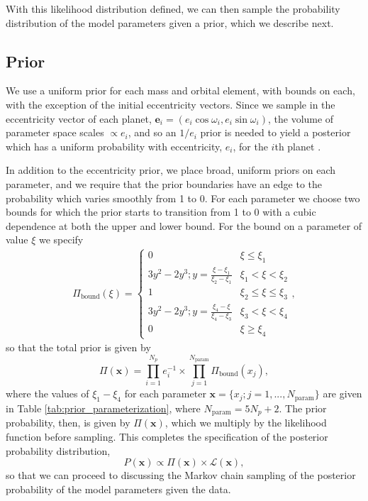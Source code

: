 \documentclass[twocolumn]{aastex63}
\begin{document}
With this likelihood distribution
defined, we can then sample the probability distribution of
the model parameters given a prior, which we describe next.

\subsection{Prior}

We use a uniform prior for each mass and orbital element,
with bounds on each, with the exception of the initial eccentricity vectors.
Since we sample in the eccentricity vector of each planet, $\mathbf{e}_i = (e_i\cos{\omega_i},e_i\sin{\omega_i})$, the volume
of parameter space scales $\propto e_i$, and so an $1/e_i$ prior is needed to
yield a posterior which has a uniform probability with eccentricity, $e_i$,
for the $i$th planet
\citep{Eastman2013}.

In addition to the eccentricity prior, we place broad, uniform priors on each parameter, and we require that
the prior boundaries have an edge to the probability which varies smoothly from 1 to 0.  For each parameter
we choose two bounds for which the prior starts to transition from 1 to 0 with a cubic dependence at both
the upper and lower bound.  For the  bound on a parameter of value $\xi$ we specify
\begin{eqnarray}
    \Pi_\mathrm{bound}(\xi) =
    \begin{cases}
        0                                            & \xi {\le} \xi_1             \\
        3y^2-2y^3; y = \frac{\xi-\xi_1}{\xi_2-\xi_1} & \xi_1 {<} \xi {<} \xi_2     \\
        1                                            & \xi_2 {\le} \xi {\le} \xi_3 \\
        3y^2-2y^3; y = \frac{\xi_4-\xi}{\xi_4-\xi_3} & \xi_3{<} \xi {<} \xi_4      \\
        0                                            & \xi {\ge} \xi_4
    \end{cases},
\end{eqnarray}
so that the total prior is given by
\begin{equation}
    \Pi(\mathbf{x}) = \prod_{i=1}^{N_p} e_i^{-1} {\times} \prod_{j=1}^{N_\mathrm{param}} \Pi_\mathrm{bound}(x_j),
\end{equation}
where the values of $\xi_1{-}\xi_4$ for each parameter
$\mathbf{x} {=} \{x_j; j{=} 1,...,N_\mathrm{param}\}$ are given in Table
\ref{tab:prior_parameterization}, where $N_\mathrm{param} = 5 N_p + 2$.
The prior probability, then, is given by $\Pi(\mathbf{x})$, which we
multiply by the likelihood function before sampling.
This completes the specification of the posterior probability distribution,
\begin{equation}
    P(\mathbf{x}) \propto \Pi(\mathbf{x}){\times}\mathcal{L}(\mathbf{x}),
\end{equation}
so that we can proceed to discussing the Markov chain sampling of the posterior probability of the model parameters given the data.
\end{document}
